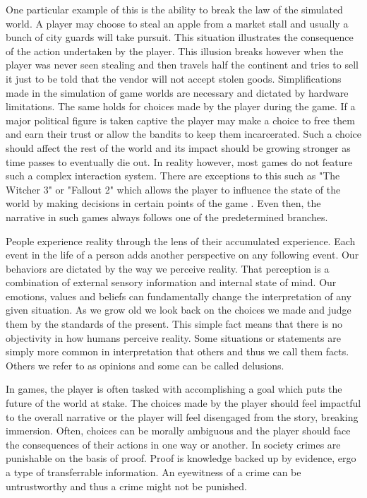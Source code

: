 One particular example of this is the ability to break the law of the simulated world.
A player may choose to steal an apple from a market stall and usually a bunch of city guards will take pursuit.
This situation illustrates the consequence of the action undertaken by the player.
This illusion breaks however when the player was never seen stealing and then travels half the continent and tries to sell it just to be told that the vendor will not accept stolen goods.
Simplifications made in the simulation of game worlds are necessary and dictated by hardware limitations.
The same holds for choices made by the player during the game.
If a major political figure is taken captive the player may make a choice to free them and earn their trust or allow the bandits to keep them incarcerated.
Such a choice should affect the rest of the world and its impact should be growing stronger as time passes to eventually die out.
In reality however, most games do not feature such a complex interaction system.
There are exceptions to this such as "The Witcher 3" or "Fallout 2" which allows the player to influence the state of the world by making decisions in certain points of the game \cite{vickery2018directing}.
Even then, the narrative in such games always follows one of the predetermined branches.

People experience reality through the lens of their accumulated experience.
Each event in the life of a person adds another perspective on any following event.
Our behaviors are dictated by the way we perceive reality.
That perception is a combination of external sensory information and internal state of mind.
Our emotions, values and beliefs can fundamentally change the interpretation of any given situation.
As we grow old we look back on the choices we made and judge them by the standards of the present.
This simple fact means that there is no objectivity in how humans perceive reality.
Some situations or statements are simply more common in interpretation that others and thus we call them facts.
Others we refer to as opinions and some can be called delusions.

In games, the player is often tasked with accomplishing a goal which puts the future of the world at stake.
The choices made by the player should feel impactful to the overall narrative or the player will feel disengaged from the story, breaking immersion.
Often, choices can be morally ambiguous and the player should face the consequences of their actions in one way or another.
In society crimes are punishable on the basis of proof.
Proof is knowledge backed up by evidence, ergo a type of transferrable information.
An eyewitness of a crime can be untrustworthy and thus a crime might not be punished.

